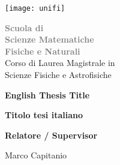 \newenvironment{helv}{\fontfamily{qhv}\selectfont}{\par}

\begin{titlepage}
\begin{helv}
    \begin{center}
        \begin{minipage}{0.52\textwidth}
            \texttt{[image: unifi]}
        \end{minipage}
        \hfill
        \begin{minipage}{0.4\textwidth}
        \begin{flushright}
        
        \fontsize{14}{16}\selectfont
        \textbf{\textcolor{gray}{
            Scuola di\\
            Scienze Matematiche\\
            Fisiche e Naturali\\
        }}
        \vspace{12pt}
        \fontsize{12}{14}\selectfont
            Corso di Laurea Magistrale in\\
            Scienze Fisiche e Astrofisiche\\
        
        \end{flushright}
        \end{minipage}
        \vfill
    \end{center}

        \hspace*{22mm}
        \begin{minipage}{0.8\textwidth}
        \begin{flushleft}
        \fontsize{36}{42}\selectfont
        \textbf{English Thesis\newline
        Title}
        \vspace{36pt}
        
        \textbf{Titolo tesi\newline
        italiano}
            
        
        \vspace{3cm}
        {
            \fontsize{14}{0}\selectfont
            \textbf{Relatore / Supervisor}
            
            \vspace{5pt}
            \fontsize{16}{0}\selectfont
            Marco Capitanio
            
}
\end{flushleft}
\end{minipage}
\end{helv}
\end{titlepage}
